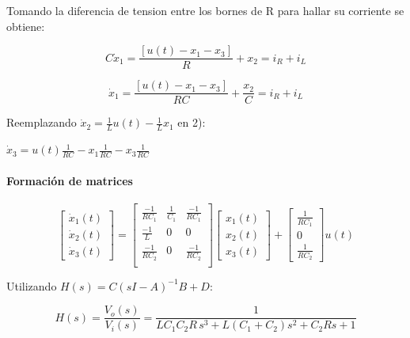 \documentclass[a4paper]{article}
\begin{document}
Tomando la diferencia de tension entre los bornes de R para hallar su corriente se obtiene: 

\begin{equation}
	 C \dot{x}_1 = \frac{[u(t) - x_1 - x_3]}{R} + x_2 = i_R + i_L 
\end{equation}

\begin{equation}
	 \dot{x}_1 = \frac{[u(t) - x_1 - x_3]}{RC} + \frac{x_2}{C} = i_R + i_L 
\end{equation}


Reemplazando $\dot{x}_2 = \frac{1}{L}u(t) - \frac{1}{L} x_1 $ en 2):

$\dot{x}_3 = u(t) \frac{1}{RC} - x_1 \frac{1}{RC} - x_3\frac{1}{RC} $
 
 \paragraph{Formación de matrices}
 
\begin{equation}
	\begin{bmatrix}
		\dot{x}_1(t) \\
		\dot{x}_2(t) \\
		\dot{x}_3(t) 
	\end{bmatrix}
	=
	\begin{bmatrix}	
		\frac{-1}{RC_1} & \frac{1}{C_1} & \frac{-1}{RC_1} \\
		\frac{-1}{L} & 0& 0\\
		\frac{-1}{RC_2} & 0 & \frac{-1}{RC_2} \\
	\end{bmatrix}
	\begin{bmatrix}
		x_1(t) \\
		x_2(t) \\
		x_3(t) 
	\end{bmatrix}
	+
	\begin{bmatrix}
		\frac{1}{RC_1} \\ 
		0 \\
		\frac{1}{RC_2}
	\end{bmatrix}
	u(t)
\end{equation}

 
 
 
 Utilizando $H(s) = C(s I  - A )^{-1} B + D $:
 
 
 \begin{equation}
 	H(s)=\frac{V_o(s)}{V_i(s)}
 	=
 	\frac{1}{
 		LC_1C_2R\,s^3
 		+
 		L(C_1+C_2)s^2
 		+
 		C_2Rs
 		+
 		1
 	}
 \end{equation}
 
\end{document}
